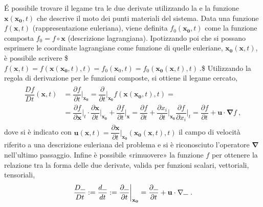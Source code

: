 \documentclass[letterpaper,10pt,italian]{jupyterBook}
\begin{document}
\sphinxAtStartPar
É possibile trovare il legame tra le due derivate utilizzando la  e la funzione \(\mathbf{x}(\mathbf{x_0},t)\)
che descrive il moto dei punti materiali del sistema. Data una funzione
\(f(\mathbf{x},t)\) (rappresentazione euleriana), viene definita
\(f_0(\mathbf{x_0},t)\) come la funzione composta \(f_0 = f \circ \mathbf{x}\)
(descrizione lagrangiana). Ipotizzando poi che si possano esprimere le
coordinate lagrangiane come funzione di quelle euleriane,
\(\mathbf{x_0}(\mathbf{x},t)\), è possibile scrivere
\$\(f(\mathbf{x},t) = f(\mathbf{x}(\mathbf{x_0},t),t) = f_0(\mathbf{x}_0,t) = f_0(\mathbf{x_0}(\mathbf{x},t),t) \ .\)\$
Utilizzando la regola di derivazione per le funzioni composte, si
ottiene il legame cercato,
\begin{equation*}
\begin{split}\label{eqn:cin:lagr-eul}
\begin{aligned}
 \dfrac{D f}{D t}(\mathbf{x},t) & = \dfrac{\partial f}{\partial t}\bigg|_{\mathbf{x_0}} = \dfrac{\partial}{\partial t}\bigg|_{\mathbf{x_0}} f(\mathbf{x}(\mathbf{x_0},t),t) =  \\ 
  & = \dfrac{\partial f}{\partial \mathbf{x}}\bigg|_{t} \cdot \dfrac{\partial \mathbf{x}}{\partial t}\bigg|_{\mathbf{x_0}} 
  + \dfrac{\partial f}{\partial t}\bigg|_{\mathbf{x}} = 
  \dfrac{\partial f}{\partial t} +  
  \dfrac{\partial x_i}{\partial t}\bigg|_{\mathbf{x_0}} \dfrac{\partial f}{\partial x_i}\bigg|_{t}  = 
  \dfrac{\partial f}{\partial t} + \mathbf{u} \cdot \mathbf{\nabla} f \ ,
\end{aligned}\end{split}
\end{equation*}
\sphinxAtStartPar
dove si è indicato con
\(\mathbf{u}(\mathbf{x},t) = \dfrac{\partial \mathbf{x}}{\partial t}\bigg|_{\mathbf{x_0}} (\mathbf{x_0}(\mathbf{x},t),t)\)
il campo di velocità riferito a una descrizione euleriana del problema e
si è riconosciuto l’operatore \(\mathbf{\nabla}\) nell’ultimo passaggio.
Infine è possibile «rimuovere» la funzione \(f\) per ottenere la relazione
tra la forma delle due derivate, valida per funzioni scalari,
vettoriali, tensoriali,
\begin{equation*}
\begin{split}\label{eqn:cin:lagr-eul-2}
 \dfrac{D \rule{1.5ex}{.4pt}}{D t} := \dfrac{d \rule{1.5ex}{.4pt}}{d t} := \dfrac{\partial \rule{1.5ex}{.4pt}}{\partial t}\bigg|_{\mathbf{x_0}} = \dfrac{\partial \rule{1.5ex}{.4pt}}{\partial t} + \mathbf{u} \cdot \mathbf{\nabla} \rule{1.5ex}{.4pt} \ .\end{split}
\end{equation*}
\end{document}
